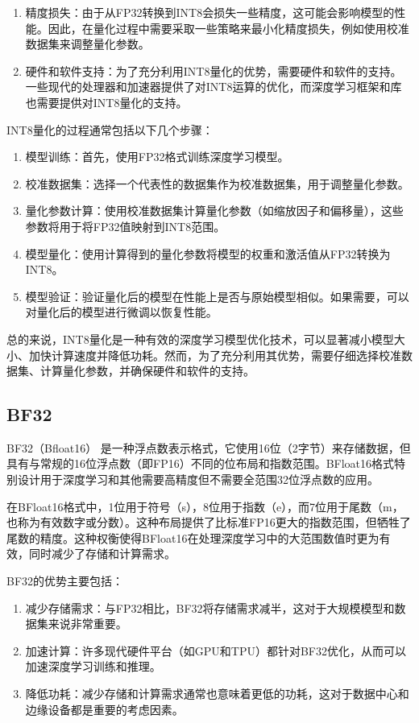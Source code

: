 \begin{enumerate}
	\item 精度损失：由于从FP32转换到INT8会损失一些精度，这可能会影响模型的性能。因此，在量化过程中需要采取一些策略来最小化精度损失，例如使用校准数据集来调整量化参数。
	\item 硬件和软件支持：为了充分利用INT8量化的优势，需要硬件和软件的支持。一些现代的处理器和加速器提供了对INT8运算的优化，而深度学习框架和库也需要提供对INT8量化的支持。
\end{enumerate}

INT8量化的过程通常包括以下几个步骤：

\begin{enumerate}
	\item 模型训练：首先，使用FP32格式训练深度学习模型。
	\item 校准数据集：选择一个代表性的数据集作为校准数据集，用于调整量化参数。
	\item 量化参数计算：使用校准数据集计算量化参数（如缩放因子和偏移量），这些参数将用于将FP32值映射到INT8范围。
	\item 模型量化：使用计算得到的量化参数将模型的权重和激活值从FP32转换为INT8。
	\item 模型验证：验证量化后的模型在性能上是否与原始模型相似。如果需要，可以对量化后的模型进行微调以恢复性能。
\end{enumerate}

总的来说，INT8量化是一种有效的深度学习模型优化技术，可以显著减小模型大小、加快计算速度并降低功耗。然而，为了充分利用其优势，需要仔细选择校准数据集、计算量化参数，并确保硬件和软件的支持。

\subsection{BF32}

BF32（Bfloat16） 是一种浮点数表示格式，它使用16位（2字节）来存储数据，但具有与常规的16位浮点数（即FP16）不同的位布局和指数范围。BFloat16格式特别设计用于深度学习和其他需要高精度但不需要全范围32位浮点数的应用。

在BFloat16格式中，1位用于符号（s），8位用于指数（e），而7位用于尾数（m，也称为有效数字或分数）。这种布局提供了比标准FP16更大的指数范围，但牺牲了尾数的精度。这种权衡使得BFloat16在处理深度学习中的大范围数值时更为有效，同时减少了存储和计算需求。

BF32的优势主要包括：

\begin{enumerate}
	\item 减少存储需求：与FP32相比，BF32将存储需求减半，这对于大规模模型和数据集来说非常重要。
	\item 加速计算：许多现代硬件平台（如GPU和TPU）都针对BF32优化，从而可以加速深度学习训练和推理。
	\item 降低功耗：减少存储和计算需求通常也意味着更低的功耗，这对于数据中心和边缘设备都是重要的考虑因素。
\end{enumerate}

